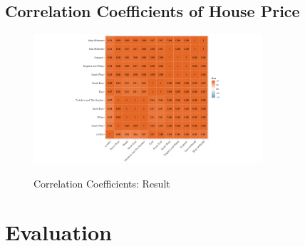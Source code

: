 \documentclass{article}
\begin{document}
\subsection{Correlation Coefficients of House Price}

\begin{figure}[htb]
  \begin{minipage}[b]{1.0\linewidth}
    \centering
    \centerline{\includegraphics[width=8.5cm]{corHeatMap}}
    \centerline{Correlation Coefficients: Result}\medskip
  \end{minipage}
\end{figure}




\section{Evaluation}



\vfill\pagebreak
\printbibliography
\end{document}
